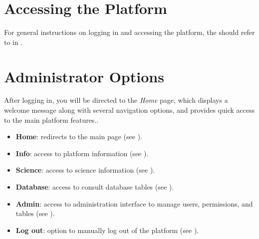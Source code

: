 


\chapter{Accessing the Platform} \label{chap:admin-access}

\rolecontent{\role}
{%
	
}
{} %
{%
	For general instructions on logging in and accessing the platform, the \admin should refer to  in \userpart.
}


\chapter{Administrator Options} \label{chap:admin-options}

After logging in, you will be directed to the \textsl{Home} page, which displays a welcome message along with several navigation options, and provides quick access to the main platform features..

\vspace{0.5cm}


\begin{itemize}
	\item \textbf{Home}: redirects to the main page (see ).
	\item \textbf{Info}: access to platform information (see ).
	\item \textbf{Science}: access to science information (see ).
	\item \textbf{Database}: access to consult database tables (see ).
	\item \textbf{Admin}: access to administration interface to manage users, permissions, and tables (see ).
	\item \textbf{Log out}: option to manually log out of the platform (see ).
\end{itemize}
  


